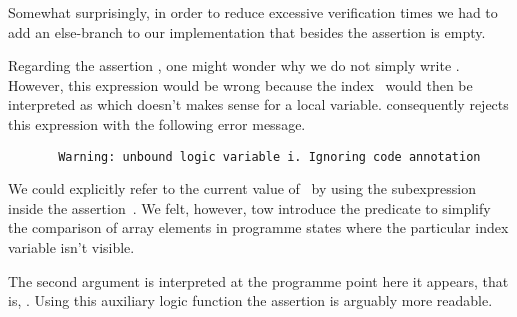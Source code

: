 Somewhat surprisingly, in order to reduce excessive verification times we had to add
an else-branch to our implementation that besides the assertion 
is empty.

Regarding the assertion , one might wonder why we do not simply write
. 
However, this expression would be wrong because the index~
would then be interpreted as
 which doesn't makes sense for a local variable.
\wpframac consequently rejects this expression with the following error message.

\begin{small}
\begin{verbatim}
       Warning: unbound logic variable i. Ignoring code annotation
\end{verbatim}
\end{small}

\clearpage

We could explicitly refer to the current value of~ by using
the subexpression  inside the assertion~.
We felt, however, tow introduce the predicate 
to simplify the comparison of array elements in programme states 
where the particular index variable isn't visible.



The second argument \At is interpreted at the programme point here it appears,
that is, .
Using this auxiliary logic function the assertion 
is arguably more readable.



\clearpage

